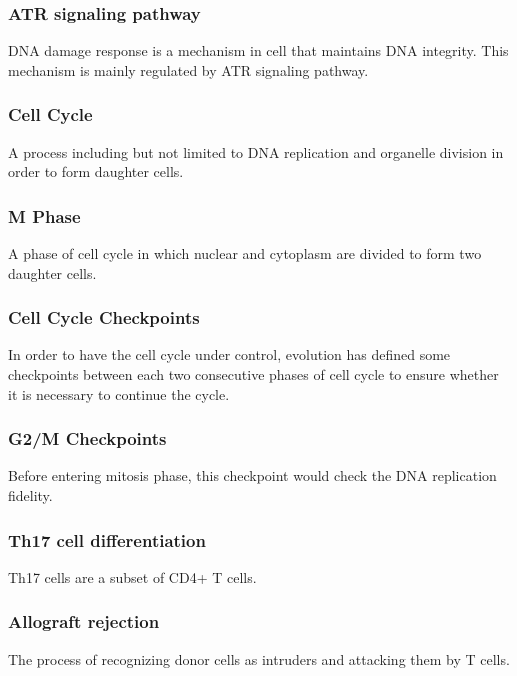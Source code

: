 \documentclass[3p,authoryear,preprint,12pt]{elsarticle}
\begin{document}
\subsubsection{ATR signaling pathway}
DNA damage response is a mechanism in cell that maintains DNA integrity. This mechanism is mainly regulated by ATR signaling pathway. %

\subsubsection{Cell Cycle}
A process including but not limited to DNA replication and organelle division in order to form daughter cells.

\subsubsection{M Phase}
A phase of cell cycle in which nuclear and cytoplasm are divided to form two daughter cells.

\subsubsection{Cell Cycle Checkpoints}
In order to have the cell cycle under control, evolution has defined some checkpoints between each two consecutive phases of cell cycle to ensure whether it is necessary to continue the cycle.

\subsubsection{G2/M Checkpoints}
Before entering mitosis phase, this checkpoint would check the DNA replication fidelity. %

\subsubsection{Th17 cell differentiation}
Th17 cells are a subset of CD4+ T cells. %

\subsubsection{Allograft rejection}
The process of recognizing donor cells as intruders and attacking them by T cells. %
\end{document}
